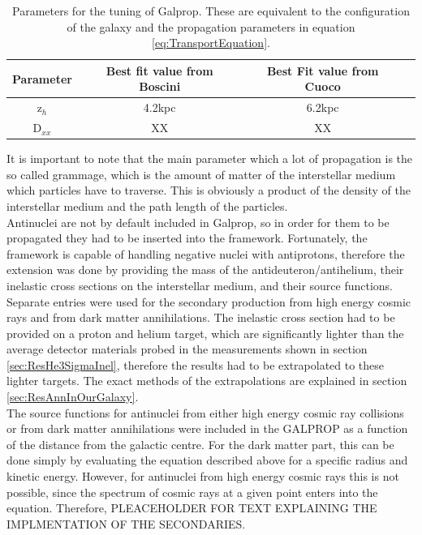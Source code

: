 \begin{table}[h]
    \centering
    \begin{tabular}{|c|c|c|c|}
        \hline
        Parameter &  Best fit value from Boscini & Best Fit value from Cuoco \\
        \hline
        z$_h$ &  4.2kpc & 6.2kpc \\
        \hline
        D$_{xx}$ & XX & XX \\
        \hline
    \end{tabular}
    \caption{Parameters for the tuning of Galprop. These are equivalent to the configuration of the galaxy and the propagation parameters in equation \ref{eq:TransportEquation}.}
    \label{tab:GalpropParameters}
\end{table}

It is important to note that the main parameter which a lot of propagation is the so called grammage, which is the amount of matter of the interstellar medium which particles have to traverse. This is obviously a product of the density of the interstellar medium and the path length of the particles. \\

Antinuclei are not by default included in Galprop, so in order for them to be propagated they had to be inserted into the framework. Fortunately, the framework is capable of handling negative nuclei with antiprotons, therefore the extension was done by providing the mass of the antideuteron/antihelium, their inelastic cross sections on the interstellar medium, and their source functions. Separate entries were used for the secondary production from high energy cosmic rays and from dark matter annihilations. The inelastic cross section had to be provided on a proton and helium target, which are significantly lighter than the average detector materials probed in the measurements shown in section \ref{sec:ResHe3SigmaInel}, therefore the results had to be extrapolated to these lighter targets. The exact methods of the extrapolations are explained in section \ref{sec:ResAnnInOurGalaxy}.\\

The source functions for antinuclei from either high energy cosmic ray collisions or from dark matter annihilations were included in the GALPROP as a function of the distance from the galactic centre. For the dark matter part, this can be done simply by evaluating the equation described above for a specific radius and kinetic energy. However, for antinuclei from high energy cosmic rays this is not possible, since the spectrum of cosmic rays at a given point enters into the equation. Therefore, PLEACEHOLDER FOR TEXT EXPLAINING THE IMPLMENTATION OF THE SECONDARIES.
